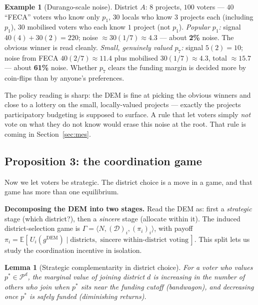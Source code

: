 \documentclass[11pt,letterpaper]{article}
\theoremstyle{definition}
\newtheorem{example}{Example}[section]
\theoremstyle{plain}
\newtheorem{lemma}{Lemma}[section]
\theoremstyle{remark}
\newcommand{\E}{\mathbb{E}}
\newcommand{\D}{\mathcal{D}}
\newcommand{\Pset}{\mathcal{P}}
\newcommand{\agents}{N}
\newcommand{\DEM}{\text{DEM}}
\begin{document}
\begin{example}[Durango-scale noise]
\label{ex:noise}
District $A$: $8$ projects, $100$ voters --- $40$ ``FECA'' voters who know only $p_1$, $30$ locals
who know $3$ projects each (including $p_1$), $30$ mobilised voters who each know $1$ project (not
$p_1$).
\emph{Popular $p_1$:} signal $40(4)+30(2)=220$; noise $\approx30(1/7)\approx4.3$ --- about
\textbf{2\%} noise. The obvious winner is read cleanly.
\emph{Small, genuinely valued $p_7$:} signal $5(2)=10$; noise from FECA $40(2/7)\approx11.4$ plus
mobilised $30(1/7)\approx4.3$, total $\approx15.7$ --- about \textbf{61\%} noise. Whether $p_7$ clears
the funding margin is decided more by coin-flips than by anyone's preferences.
\end{example}

\begin{connection}
The policy reading is sharp: the DEM is fine at picking the obvious winners and close to a lottery
on the small, locally-valued projects --- exactly the projects participatory budgeting is supposed to
surface. A rule that let voters simply \emph{not} vote on what they do not know would erase this
noise at the root. That rule is coming in Section~\ref{sec:mes}.
\end{connection}

\subsection{Proposition 3: the coordination game}

Now we let voters be strategic. The district choice is a move in a game, and that game has more
than one equilibrium.

\begin{aside}\small
\textbf{Decomposing the DEM into two stages.} Read the DEM as: first a \emph{strategic} stage
(which district?), then a \emph{sincere} stage (allocate within it). The induced
district-selection game is $\Gamma=\langle\agents,(\D)_i,(\pi_i)_i\rangle$, with payoff
$\pi_i=\E[\,U_i(g^{\DEM})\mid\text{districts},\text{ sincere within-district voting}\,]$. This
split lets us study the coordination incentive in isolation.
\end{aside}

\begin{lemma}[Strategic complementarity in district choice]
\label{lem:complement}
For a voter who values $p^*\in\Pset^d$, the marginal value of joining district $d$ is
\emph{increasing} in the number of others who join when $p^*$ sits near the funding cutoff
(bandwagon), and \emph{decreasing} once $p^*$ is safely funded (diminishing returns).
\end{lemma}
\end{document}
